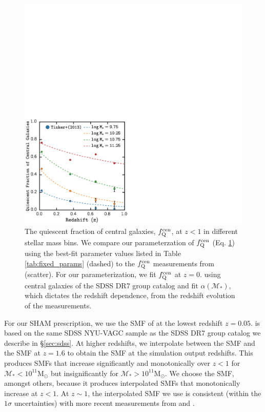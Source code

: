 \begin{figure}
\begin{center}
\includegraphics[width=\textwidth]{figs/cenq/fqcen.pdf}
\caption{The quiescent fraction of central galaxies, $f_\mathrm{Q}^\mathrm{cen}$, 
at $z < 1$ in different stellar mass bins. We compare our 
parameterzation of $f_\mathrm{Q}^\mathrm{cen}$ (Eq. \ref{fig:fqcen}) using the 
best-fit parameter values listed in Table \ref{tab:fixed_params} (dashed) 
to the $f_\mathrm{Q}^\mathrm{cen}$ measurements from \cite{Tinker:2013aa} (scatter). 
For our parameterization, we fit $f_\mathrm{Q}^\mathrm{cen}$ at $z = 0.$ using central 
galaxies of the SDSS DR7 group catalog and fit $\alpha(\mathcal{M}_*)$, 
which dictates the redshift dependence, from the redshift evolution  
of the \cite{Tinker:2013aa} measurements.}
\label{fig:fqcen}
\end{center}
\end{figure}

For our SHAM prescription, we use the SMF of \cite{Li:2009aa} at the 
lowest redshift $z = 0.05$. \cite{Li:2009aa} is based on the same 
SDSS NYU-VAGC sample as the SDSS DR7 group catalog we describe in 
\S \ref{sec:sdss}. At higher redshifts, we interpolate between the 
\cite{Li:2009aa} SMF and the \cite{Marchesini:2009aa} SMF at $z = 1.6$ 
to obtain the SMF at the simulation output redshifts. This produces 
SMFs that increase significantly and monotonically over $z < 1$ for 
$\mathcal{M}_* < 10^{11} \mathrm{M}_\odot$ but insignificantly for 
$\mathcal{M}_* > 10^{11} \mathrm{M}_\odot$. 
We choose the \cite{Marchesini:2009aa} SMF, amongst others, because 
it produces interpolated SMFs that monotonically increase at $z < 1$. 
At $z \sim 1$, the interpolated SMF we use is consistent (within 
the $1\sigma$ uncertainties) with more recent measurements from 
\cite{Muzzin:2013aa} and \cite{Ilbert:2013aa}. 

